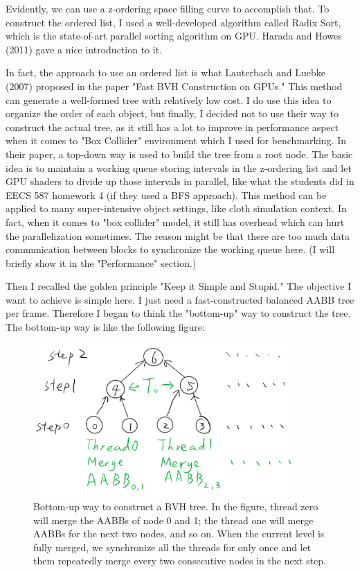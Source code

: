 \documentclass[11pt]{article}
\begin{document}
Evidently, we can use a z-ordering space filling curve to accomplish that. To construct the ordered list, I used a well-developed algorithm called Radix Sort, which is the state-of-art parallel sorting algorithm on GPU. Harada and Howes (2011) gave a nice introduction to it.

In fact, the approach to use an ordered list is what Lauterbach and Luebke (2007) proposed in the paper "Fast BVH Construction on GPUs." This method can generate a well-formed tree with relatively low cost. I do use this idea to organize the order of each object, but finally, I decided not to use their way to construct the actual tree, as it still has a lot to improve in performance aspect when it comes to "Box Collider" environment which I used for benchmarking. In their paper, a top-down way is used to build the tree from a root node. The basic idea is to maintain a working queue storing intervals in the z-ordering list and let GPU shaders to divide up those intervals in parallel, like what the students did in EECS 587 homework 4 (if they used a BFS approach). This method can be applied to many super-intensive object settings, like cloth simulation context. In fact, when it comes to "box collider" model, it still has overhead which can hurt the parallelization sometimes. The reason might be that there are too much data communication between blocks to synchronize the working queue here. (I will briefly show it in the "Performance" section.)

Then I recalled the golden principle "Keep it Simple and Stupid." The objective I want to achieve is simple here. I just need a fast-constructed balanced AABB tree per frame. Therefore I began to think the "bottom-up" way to construct the tree. The bottom-up way is like the following figure:

\begin{figure}[htbp]
\centering
\includegraphics[width=10cm]{./rep_7.png}
\caption{Bottom-up way to construct a BVH tree. In the figure, thread zero will merge the AABBs of node 0 and 1; the thread one will merge AABBs for the next two nodes,  and so on. When the current level is fully merged, we synchronize all the threads for only once and let them repeatedly merge every two consecutive nodes in the next step.}
\end{figure}
\end{document}
